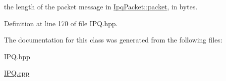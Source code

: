 the length of the packet message in \hyperlink{classIPQ_1_1IpqPacket_a2bdf247f13a3e9f86e9e3846e6a9cb45}{\-Ipq\-Packet\-::packet}, in bytes. 



\-Definition at line 170 of file \-I\-P\-Q.\-hpp.



\-The documentation for this class was generated from the following files\-:\begin{DoxyCompactItemize}
\item 
\hyperlink{IPQ_8hpp}{\-I\-P\-Q.\-hpp}\item 
\hyperlink{IPQ_8cpp}{\-I\-P\-Q.\-cpp}\end{DoxyCompactItemize}
